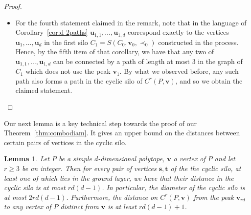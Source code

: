 \documentclass[centering,11pt,reqno]{amsart}
\newtheorem{lem}[theorem]{Lemma}
\theoremstyle{definition}
\begin{document}
\begin{proof}
\begin{itemize}
Hence, for each $i\in [d]$, the vertices $\mathbf{u}_{i,j}$ and $\mathbf{v}_{i,j}$ correspond exactly to the vertices $\mathbf{u}_{\overline{i-j+1}}$ and $\mathbf{v}_{\overline{i-j+1}}$ in the notation of Corollary~\ref{cor:d-2paths}, applied to $C_{j}=S(C_{j-1},\mathbf{v}_{j-1},\prec_{j-1})$ in place of $S(P,\mathbf{v},\prec)$. It thus follows by the second item of Corollary~\ref{cor:d-2paths} that for each $i\in [d]$ there exists a path of length at most $d-2$ on $C_{j}$ from $\mathbf{u}_{i,j}$ to $\mathbf{v}_{i,j}$, and from $\mathbf{u}_{\overline{j},j}$ to $\mathbf{v}_{i,j}$, provided that $\overline{i-j+1}\neq 2$, i.e., $i\neq \overline{j+1}$. Moreover, all vertices of these paths are distinct from the peak of $C_{j}$. As we argued in the first and second item of this proof, this means that these paths also exist in the cyclic silo of $C^r(P,\mathbf{v})$. This establishes the statement claimed in the third item of the remark and concludes its proof.
\item For the fourth statement claimed in the remark, note that in the language of Corollary~\ref{cor:d-2paths} $\mathbf{u}_{1,1},\ldots,\mathbf{u}_{1,d}$ correspond exactly to the vertices $\mathbf{u}_1,\ldots,\mathbf{u}_d$ in the first silo $C_1=S(C_0,\mathbf{v}_0,\prec_0)$ constructed in the process. Hence, by the fifth item of that corollary, we have that any two of $\mathbf{u}_{1,1},\ldots,\mathbf{u}_{1,d}$ can be connected by a path of length at most $3$ in the graph of $C_1$ which does not use the peak $\mathbf{v}_1$. By what we observed before, any such path also forms a path in the cyclic silo of $C^r(P,\mathbf{v})$, and so we obtain the claimed statement.
\end{itemize}
\end{proof}
Our next lemma is a key technical step towards the proof of our Theorem~\ref{thm:combodiam}. It gives an upper bound on the distances between certain pairs of vertices in the cyclic silo.
\begin{lem}
\label{lem:silodiameter}
Let $P$ be a simple $d$-dimensional polytope, $\mathbf{v}$ a vertex of $P$ and let $r\ge 3$ be an integer. Then for every pair of vertices $\mathbf{s},\mathbf{t}$ of the the cyclic silo, at least one of which lies in the ground layer, we have that their distance in the cyclic silo is at most $rd(d-1)$. In particular, the diameter of the cyclic silo is at most $2rd(d-1)$. Furthermore, the distance on $C^r(P,\mathbf{v})$ from the peak $\mathbf{v}_{rd}$ to any vertex of $P$ distinct from $\mathbf{v}$ is at least $rd(d-1)+1$.
\end{lem}
\end{document}
